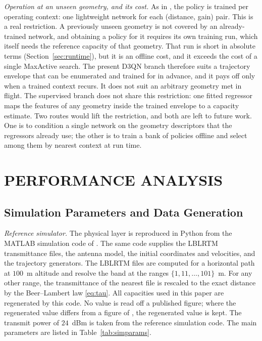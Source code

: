 \documentclass[correspondence]{IEEEtaes}
\begin{document}
\emph{Operation at an unseen geometry, and its cost.} As in \cite{elcik2025d3qn}, the
policy is trained per operating context: one lightweight network for each
(distance, gain) pair. This is a real restriction. A previously unseen geometry is not
covered by an already-trained network, and obtaining a policy for it requires its own
training run, which itself needs the reference capacity of that geometry. That run is
short in absolute terms (Section~\ref{sec:runtime}), but it is an offline cost, and it
exceeds the cost of a single MaxActive search. The present D3QN branch therefore suits a
trajectory envelope that can be enumerated and trained for in advance, and it pays off
only when a trained context recurs. It does not suit an arbitrary geometry met in
flight. The supervised branch does not share this restriction: one fitted regressor maps
the features of any geometry inside the trained envelope to a capacity estimate. Two
routes would lift the restriction, and both are left to future work. One is to condition
a single network on the geometry descriptors that the regressors already use; the other
is to train a bank of policies offline and select among them by nearest context at run
time.


\section{PERFORMANCE ANALYSIS}
\label{sec:perf}
\subsection{Simulation Parameters and Data Generation}
\label{sec:setup}
\emph{Reference simulator.} The physical layer is reproduced in Python from the MATLAB
simulation code of \cite{saeed2024maxactive}. The same code supplies the LBLRTM
transmittance files, the antenna model, the initial coordinates and velocities, and the
trajectory generators. The LBLRTM files are computed for a horizontal path at $100$~m
altitude and resolve the band at the ranges $\{1,11,\dots,101\}$~m. For any other range,
the transmittance of the nearest file is rescaled to the exact distance by the
Beer--Lambert law \eqref{eq:tau}. All capacities used in this paper are regenerated by
this code. No value is read off a published figure; where the regenerated value differs
from a figure of \cite{saeed2024maxactive}, the regenerated value is kept. The transmit
power of $24$~dBm is taken from the reference simulation code. The main parameters are
listed in Table~\ref{tab:simparams}.
\end{document}
